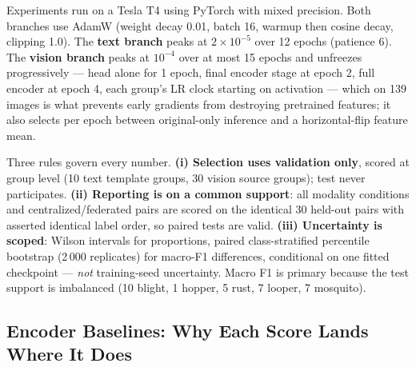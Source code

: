 \documentclass[conference]{IEEEtran}
\begin{document}
Experiments run on a Tesla T4 using PyTorch with mixed
precision. Both branches use AdamW (weight decay 0.01, batch 16, warmup then
cosine decay, clipping 1.0). The \textbf{text branch} peaks at $2\times10^{-5}$
over 12 epochs (patience 6). The \textbf{vision branch} peaks at $10^{-4}$ over
at most 15 epochs and unfreezes progressively --- head alone for 1 epoch, final
encoder stage at epoch 2, full encoder at epoch 4, each group's LR clock starting
on activation --- which on 139 images is what prevents early gradients from
destroying pretrained features; it also selects per epoch between original-only
inference and a horizontal-flip feature mean.

Three rules govern every number. \textbf{(i) Selection uses validation only},
scored at group level (10 text template groups, 30 vision source groups); test
never participates. \textbf{(ii) Reporting is on a common support}: all modality
conditions and centralized/federated pairs are scored on the identical 30
held-out pairs with asserted identical label order, so paired tests are valid.
\textbf{(iii) Uncertainty is scoped}: Wilson intervals for proportions, paired
class-stratified percentile bootstrap (2\,000 replicates) for macro-F1
differences, conditional on one fitted checkpoint --- \emph{not} training-seed
uncertainty. Macro F1 is primary because the test support is imbalanced (10
blight, 1 hopper, 5 rust, 7 looper, 7 mosquito).

\subsection{Encoder Baselines: Why Each Score Lands Where It Does}
\label{sec:encoders}
\end{document}
